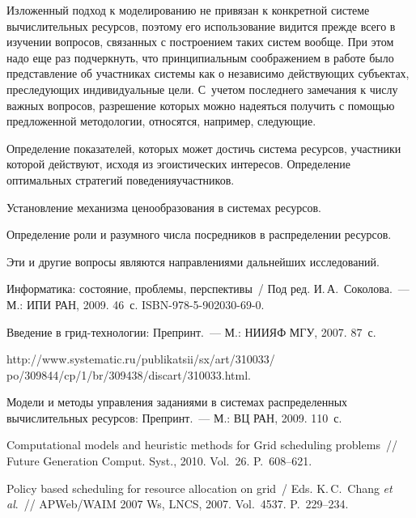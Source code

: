 \begin{multicols}{2}
  Изложенный подход к моделированию не привязан к конкретной системе 
вычислительных ресурсов, поэтому его использование видится прежде всего в изучении 
вопросов, связанных с по\-стро\-ени\-ем таких систем вообще. При этом надо еще раз 
подчеркнуть, что принципиальным соображением в работе было представление об 
участниках системы как о независимо действующих субъектах, преследующих 
индивидуальные цели. С~учетом последнего замечания к числу важных вопросов, 
разрешение которых можно надеяться получить с помощью предложенной методологии, 
относятся, например, следующие.
  
  Определение показателей, которых может достичь система ресурсов, участники которой 
действуют, исходя из эгоистических интересов. Определение оптимальных стратегий 
поведения\linebreak участников.
  
  Установление механизма ценообразования в сис\-те\-мах ресурсов.
  
  Определение роли и разумного числа посредников в распределении ресурсов.
  
  Эти и другие вопросы являются направлениями дальнейших исследований.


{\small\frenchspacing
{%
\begin{thebibliography}{99}
  Информатика: состояние, проблемы, перспективы~/ Под ред. И.\,А.~Соколова.~--- М.: 
ИПИ РАН, 2009. 46~с. ISBN-978-5-902030-69-0.
  
  Введение в грид-технологии: Препринт.~--- М.: НИИЯФ МГУ, 2007.  87~с.
  
  {\sf http://www.systematic.ru/publikatsii/sx/art/310033/ po/309844/cp/1/br/309438/discart/310033.html}.
  
  Модели и методы управления заданиями в системах распределенных вычислительных 
ресурсов: Препринт.~--- М.: ВЦ РАН, 2009.  110~с.

  Computational models and heuristic methods for Grid scheduling problems~// Future Generation 
Comput. Syst., 2010. Vol.~26. P.~608--621.
  
  
  Policy based scheduling for resource allocation on grid~/ Eds. K.\,C.~Chang \textit{et al}.~// 
APWeb/WAIM 2007 Ws, LNCS, 2007. Vol.~4537. P.~229--234.
  

\end{thebibliography}}}
\end{multicols}
